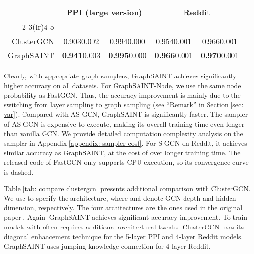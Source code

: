 \documentclass{article} \usepackage{iclr2020_conference,times}
\newcommand{\graphsaint}{{\fontfamily{lmtt}\selectfont GraphSAINT}}
\begin{document}
\begin{table*}[!ht]
\caption{Additional comparison with ClusterGCN (test set F1-micro score)}
    \centering
\begin{tabular}{rcccc}
    \toprule
     & \multicolumn{2}{c}{PPI (large version)} & \multicolumn{2}{c}{Reddit} \\
     \cmidrule(lr){2-3}\cmidrule(lr){4-5} &  &  &  & \\
    \midrule
    ClusterGCN& 0.9030.002 & 0.9940.000 & 0.9540.001 & 0.9660.001\\
     {\graphsaint}& \textbf{0.941}0.003 & \textbf{0.995}0.000 & \textbf{0.966}0.001 & \textbf{0.970}0.001\\
     \bottomrule
\end{tabular}
\label{tab: compare clustergcn}
\end{table*}


Clearly, with appropriate graph samplers, {\graphsaint} achieves significantly higher accuracy on all datasets. 
For {\graphsaint}-Node, we use the same node probability as FastGCN. Thus, the accuracy improvement is mainly due to the switching from layer sampling to graph sampling (see ``Remark'' in Section \ref{sec: var}). 
Compared with AS-GCN, {\graphsaint} is significantly faster. The sampler of AS-GCN is expensive to execute, making its overall training time even longer than vanilla GCN. We provide detailed computation complexity analysis on the sampler in Appendix \ref{appendix: sampler cost}. 
For S-GCN on Reddit, it achieves similar accuracy as {\graphsaint}, at the cost of over  longer training time. 
The released code of FastGCN only supports CPU execution, so its convergence curve is dashed. 



Table \ref{tab: compare clustergcn} presents additional comparison with ClusterGCN. We use  to specify the architecture, where  and  denote GCN depth and hidden dimension, respectively. 
The four architectures are the ones used in the original paper \citep{cluster-gcn}. Again, {\graphsaint} achieves significant accuracy improvement. 
To train models with  often requires additional architectural tweaks. ClusterGCN uses its diagonal enhancement technique for the 5-layer PPI and 4-layer Reddit models. {\graphsaint} uses jumping knowledge connection \citep{jk-net} for 4-layer Reddit. 
\end{document}

